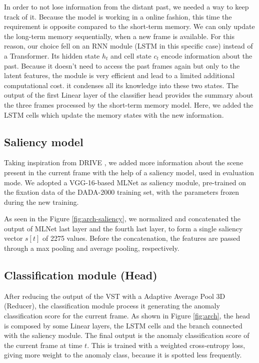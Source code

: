 In order to not lose information from the distant past, we needed a way to keep track of it.
Because the model is working in a online fashion, this time the requirement is opposite compared to the short-term memory.
We can only update the long-term memory sequentially, when a new frame is available.
For this reason, our choice fell on an RNN module (LSTM in this specific case) instead of a Transformer.
Its hidden state $h_t$ and cell state $c_t$ encode information about the past.
Because it doesn't need to access the past frames again but only to the latent features, the module is very efficient and lead to a limited additional computational cost.
it condenses all its knowledge into these two states.
The output of the first Linear layer of the classifier head provides the summary about the three frames processed by the short-term memory model.
Here, we added the LSTM cells which update the memory states with the new information.

\subsection{Saliency model}

Taking inspiration from DRIVE \cite{bao2021drive}, we added more information about the scene present in the current frame with the help of a saliency model, used in evaluation mode.
We adopted a VGG-16-based MLNet \cite{cornia2016deep} as saliency module, pre-trained on the fixation data of the DADA-2000 \cite{fang2019dada} training set, with the parameters frozen during the new training.

As seen in the Figure \ref{fig:arch-saliency}, we normalized and concatenated the output of MLNet last layer and the fourth last layer, to form a single saliency vector $s[t]$ of 2275 values.
Before the concatenation, the features are passed through a max pooling and average pooling, respectively.

\subsection{Classification module (Head)}

After reducing the output of the VST with a Adaptive Average Pool 3D (Reducer), the classification module process it generating the anomaly classification score for the current frame.
As shown in Figure \ref{fig:arch}, the head is composed by some Linear layers, the LSTM cells and the branch connected with the saliency module.
The final output is the anomaly classification score of the current frame at time $t$.
This is trained with a weighted cross-entropy loss, giving more weight to the anomaly class, because it is spotted less frequently.

